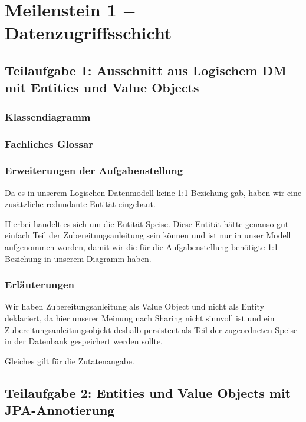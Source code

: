 \section{Meilenstein 1 $-$ Datenzugriffsschicht}

\subsection{Teilaufgabe 1: Ausschnitt aus Logischem DM mit Entities und Value Objects}

\subsubsection{Klassendiagramm}


\subsubsection{Fachliches Glossar}


\subsubsection{Erweiterungen der Aufgabenstellung}

Da es in unserem Logischen Datenmodell keine 1:1-Beziehung gab,
haben wir eine zus\"atzliche redundante Entit\"at eingebaut.

Hierbei handelt es sich um die Entit\"at Speise. Diese Entit\"at
h\"atte genauso gut einfach Teil der Zubereitungsanleitung sein
k\"onnen und ist nur in unser Modell aufgenommen worden, damit
wir die f\"ur die Aufgabenstellung ben\"otigte 1:1-Beziehung in
unserem Diagramm haben.

\subsubsection{Erl\"auterungen}

Wir haben Zubereitungsanleitung als Value Object und nicht als
Entity deklariert, da hier unserer Meinung nach Sharing nicht
sinnvoll ist und ein Zubereitungsanleitungsobjekt deshalb
persistent als Teil der zugeordneten Speise in der Datenbank
gespeichert werden sollte.

Gleiches gilt f\"ur die Zutatenangabe.


\newpage

\subsection{Teilaufgabe 2: Entities und Value Objects mit JPA-Annotierung}

